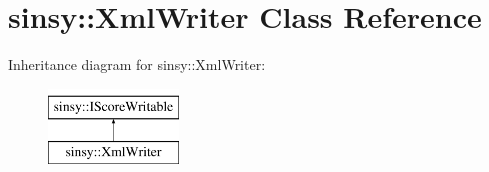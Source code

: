 \hypertarget{classsinsy_1_1XmlWriter}{\section{sinsy\-:\-:\-Xml\-Writer \-Class \-Reference}
\label{classsinsy_1_1XmlWriter}
}
\-Inheritance diagram for sinsy\-:\-:\-Xml\-Writer\-:\begin{figure}[H]
\begin{center}
\leavevmode
\includegraphics[height=2.000000cm]{classsinsy_1_1XmlWriter}
\end{center}
\end{figure}
